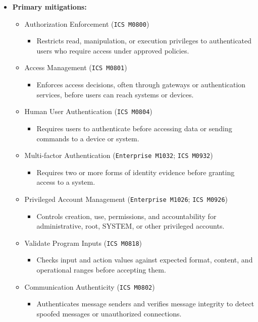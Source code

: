 \documentclass[10pt,a4paper,oneside]{report}
\begin{document}
\begin{itemize}
\item \textbf{Primary mitigations:}
\begin{itemize}
\item Authorization Enforcement (\texttt{ICS M0800})
\begin{itemize}
\item Restricts read, manipulation, or execution privileges to authenticated users who require access under approved policies.
\end{itemize}
\item Access Management (\texttt{ICS M0801})
\begin{itemize}
\item Enforces access decisions, often through gateways or authentication services, before users can reach systems or devices.
\end{itemize}
\item Human User Authentication (\texttt{ICS M0804})
\begin{itemize}
\item Requires users to authenticate before accessing data or sending commands to a device or system.
\end{itemize}
\item Multi-factor Authentication (\texttt{Enterprise M1032}; \texttt{ICS M0932})
\begin{itemize}
\item Requires two or more forms of identity evidence before granting access to a system.
\end{itemize}
\item Privileged Account Management (\texttt{Enterprise M1026}; \texttt{ICS M0926})
\begin{itemize}
\item Controls creation, use, permissions, and accountability for administrative, root, SYSTEM, or other privileged accounts.
\end{itemize}
\item Validate Program Inputs (\texttt{ICS M0818})
\begin{itemize}
\item Checks input and action values against expected format, content, and operational ranges before accepting them.
\end{itemize}
\item Communication Authenticity (\texttt{ICS M0802})
\begin{itemize}
\item Authenticates message senders and verifies message integrity to detect spoofed messages or unauthorized connections.

\end{itemize}
\end{itemize}
\end{itemize}
\end{document}
